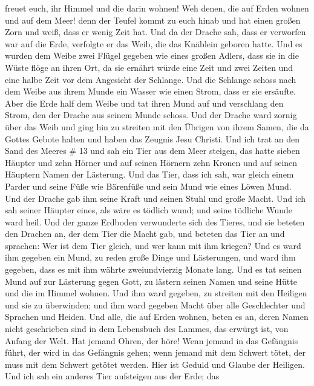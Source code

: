 freuet euch, ihr Himmel und die darin wohnen! Weh denen, die auf Erden
wohnen und auf dem Meer! denn der Teufel kommt zu euch hinab und hat
einen großen Zorn und weiß, dass er wenig Zeit hat.  Und da
der Drache sah, dass er verworfen war auf die Erde, verfolgte er das
Weib, die das Knäblein geboren hatte.  Und es wurden dem
Weibe zwei Flügel gegeben wie eines großen Adlers, dass sie in die Wüste
flöge an ihren Ort, da sie ernährt würde eine Zeit und zwei Zeiten und
eine halbe Zeit vor dem Angesicht der Schlange.  Und die
Schlange schoss nach dem Weibe aus ihrem Munde ein Wasser wie einen
Strom, dass er sie ersäufte.  Aber die Erde half dem Weibe
und tat ihren Mund auf und verschlang den Strom, den der Drache aus
seinem Munde schoss.  Und der Drache ward zornig über das
Weib und ging hin zu streiten mit den Übrigen von ihrem Samen, die da
Gottes Gebote halten und haben das Zeugnis Jesu Christi. 
Und ich trat an den Sand des Meeres \# 13  und sah ein Tier
aus dem Meer steigen, das hatte sieben Häupter und zehn Hörner und auf
seinen Hörnern zehn Kronen und auf seinen Häuptern Namen der Lästerung.
 Und das Tier, dass ich sah, war gleich einem Parder und
seine Füße wie Bärenfüße und sein Mund wie eines Löwen Mund. Und der
Drache gab ihm seine Kraft und seinen Stuhl und große Macht.
 Und ich sah seiner Häupter eines, als wäre es tödlich wund;
und seine tödliche Wunde ward heil. Und der ganze Erdboden verwunderte
sich des Tieres,  und sie beteten den Drachen an, der dem
Tier die Macht gab, und beteten das Tier an und sprachen: Wer ist dem
Tier gleich, und wer kann mit ihm kriegen?  Und es ward ihm
gegeben ein Mund, zu reden große Dinge und Lästerungen, und ward ihm
gegeben, dass es mit ihm währte zweiundvierzig Monate lang. 
Und es tat seinen Mund auf zur Lästerung gegen Gott, zu lästern seinen
Namen und seine Hütte und die im Himmel wohnen.  Und ihm
ward gegeben, zu streiten mit den Heiligen und sie zu überwinden; und
ihm ward gegeben Macht über alle Geschlechter und Sprachen und Heiden.
 Und alle, die auf Erden wohnen, beten es an, deren Namen
nicht geschrieben sind in dem Lebensbuch des Lammes, das erwürgt ist,
von Anfang der Welt.  Hat jemand Ohren, der höre!
 Wenn jemand in das Gefängnis führt, der wird in das
Gefängnis gehen; wenn jemand mit dem Schwert tötet, der muss mit dem
Schwert getötet werden. Hier ist Geduld und Glaube der Heiligen.
 Und ich sah ein anderes Tier aufsteigen aus der Erde; das
